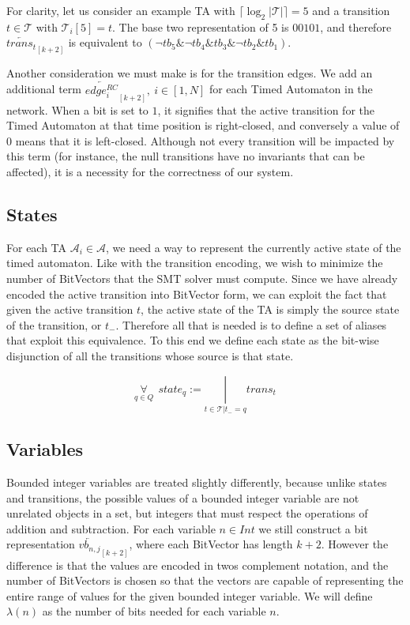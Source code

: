 \documentclass[a4paper,12pt]{article}
\newcommand*\BitAnd{\mathbin{\&}}
\newcommand*\BitOr{\mathbin{|}}
\begin{document}
For clarity, let us consider an example TA with
\(\lceil\log_2 |\mathcal{T}|\rceil = 5\) and a transition \(t \in \mathcal{T}\)
with \(\mathcal{T}_{i}[5] = t\). The base two representation of 5 is \(00101\), and therefore
\(\overleftarrow{trans_t}_{[k+2]}\) is equivalent to \((\neg tb_5 \BitAnd
\neg tb_4 \BitAnd tb_3 \BitAnd \neg tb_2 \BitAnd tb_1)\).

Another consideration we must make is for the transition edges. We add an
additional term \(\overleftarrow{edge_{i}^{RC}}_{[k{+}2]},\ i \in [1,N]\) for
each Timed Automaton in the network. When a bit is set to \(1\), it signifies
that the active transition for the Timed Automaton at that time position is
right-closed, and conversely a value of \(0\) means that it is left-closed.
Although not every transition will be impacted by this term (for instance, the
null transitions have no invariants that can be affected), it is a necessity for
the correctness of our system.


\subsection{States}\label{encoding-states}

For each TA \(\mathcal{A}_i \in \mathcal{A}\), we need a way to represent the
currently active state of the timed automaton. Like with the transition
encoding, we wish to minimize the number of BitVectors that the SMT solver must
compute. Since we have already encoded the active transition into BitVector
form, we can exploit the fact that given the active transition \(t\), the active
state of the TA is simply the source state of the transition, or \(t_{-}\).
Therefore all that is needed is to define a set of aliases that exploit this
equivalence. To this end we define each state as the bit-wise disjunction of all
the transitions whose source is that state.

\[\underset{q \in Q}{\forall}\ \ state_q := \underset{t \in \mathcal{T}|t_{-} = q}{\BitOr}trans_t\]

\subsection{Variables}\label{encoding-variables}

Bounded integer variables are treated slightly differently, because unlike
states and transitions, the possible values of a bounded integer variable are
not unrelated objects in a set, but integers that must respect the operations of
addition and subtraction. For each variable \(n \in Int\) we still construct a
bit representation \(\overleftarrow{vb_{n,j}}_{[k+2]}\), where each BitVector
has length \(k+2\). However the difference is that the values are encoded in twos
complement notation, and the number of BitVectors is chosen so that the vectors
are capable of representing the entire range of values for the given bounded
integer variable. We will define \(\lambda(n)\) as the number of bits needed for
each variable \(n\).
\end{document}
